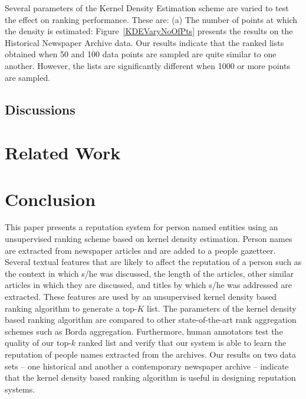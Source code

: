 \documentclass[a4paper,man,natbib]{apa6}
\begin{document}
Several parameters of the Kernel Density Estimation scheme are varied to test the effect on ranking performance. These are: (a) The number of points at which the density is estimated: Figure~\ref{KDEVaryNoOfPts} presents the results on the Historical Newspaper Archive data. Our results indicate that the ranked lists obtained when 50 and 100 data points are sampled are quite similar to one another. However, the lists are significantly different when 1000 or more points are sampled. 


\subsection{Discussions}

\section{Related Work}
\label{related}




\section{Conclusion}
\label{conc}

This paper presents a reputation system for person named entities using an unsupervised ranking scheme based on kernel density estimation. Person names are extracted from newspaper articles and are added to a people gazetteer. Several textual features that are likely to affect the reputation of a person such as the context in which s/he was discussed, the length of the articles, other similar articles in which they are discussed, and titles by which s/he was addressed are extracted. These features are used by an unsupervised kernel density based ranking algorithm to generate a top-$K$ list. The parameters of the kernel density based ranking algorithm are compared to other state-of-the-art rank aggregation schemes such as Borda aggregation. Furthermore, human annotators test the quality of our top-$k$ ranked list and verify that our system is able to learn the reputation of people names extracted from the archives. Our results on two data sets -- one historical and another a contemporary newspaper archive -- indicate that the kernel density based ranking algorithm is useful in designing reputation systems.
\end{document}
